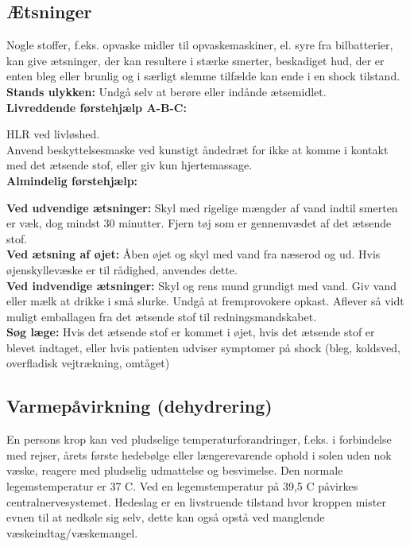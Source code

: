 \documentclass[../../../main.tex]{subfiles}
\begin{document}
\begin{multicols}{2}
\subsection*{Ætsninger} Nogle stoffer, f.eks. opvaske midler til opvaskemaskiner, el. syre fra bilbatterier, kan give ætsninger, der kan resultere i stærke smerter, beskadiget hud, der er enten bleg eller brunlig og i særligt slemme tilfælde kan ende i en shock tilstand.
\\

\textbf{Stands ulykken:} Undgå selv at berøre eller indånde ætsemidlet.
\\

\textbf{Livreddende førstehjælp A-B-C:} 

\textbf{}HLR ved livløshed.
\\
\textbf{}Anvend beskyttelsesmaske ved kunstigt åndedræt for ikke at komme i kontakt med det ætsende stof, eller giv kun hjertemassage.
\\

\textbf{Almindelig førstehjælp:} 

\textbf{Ved udvendige ætsninger:} Skyl med rigelige mængder af vand indtil smerten er væk, dog mindst 30 minutter. Fjern tøj som er gennemvædet af det ætsende stof.
\\

\textbf{Ved ætsning af øjet:} Åben øjet og skyl med vand fra næserod og ud. Hvis øjenskyllevæske er til rådighed, anvendes dette.
\\

\textbf{Ved indvendige ætsninger:} Skyl og rens mund grundigt med vand. Giv vand eller mælk at drikke i små slurke. Undgå at fremprovokere opkast. Aflever så vidt muligt emballagen fra det ætsende stof til redningsmandskabet.
\\

\textbf{Søg læge:} Hvis det ætsende stof er kommet i øjet, hvis det ætsende stof er blevet indtaget, eller hvis patienten udviser symptomer på shock (bleg, koldsved, overfladisk vejtrækning, omtåget)
\subsection*{Varmepåvirkning (dehydrering)} En persons krop kan ved pludselige
temperaturforandringer, f.eks. i forbindelse med rejser, årets første hedebølge eller længerevarende ophold i solen uden nok væske, reagere med pludselig udmattelse og besvimelse. Den normale legemstemperatur er 37 C. Ved en legemstemperatur på 39,5 C påvirkes centralnervesystemet.
Hedeslag er en livstruende tilstand hvor kroppen mister evnen til at nedkøle sig selv, dette kan også opstå ved manglende væskeindtag/væskemangel.
\\


\end{multicols}
\end{document}
